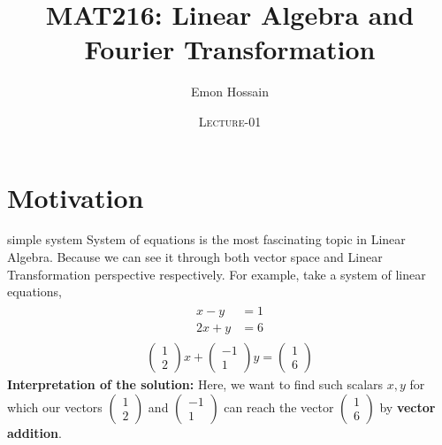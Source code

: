 \documentclass[11pt]{beamer}
\author[] %
{Emon Hossain\inst{1}}
\institute[University of Dhaka] %
{
  \inst{1}%
  Lecturer\\
  emon.hossain@bracu.ac.bd\\
  \\MNS department\\Brac University
}
\date[] %
{\textsc{Lecture-01}}
\title[]{MAT216: Linear Algebra and Fourier Transformation}
\theoremstyle{plain}
\begin{document}
\begin{frame}
\titlepage
\end{frame}

\section{Motivation}
\begin{frame}{simple system}
System of equations is the most fascinating topic in Linear Algebra. Because we can see it through both vector space and Linear Transformation perspective respectively. For example, take a system of linear equations,
\begin{align}
\begin{split}
    x-y&=1\\
    2x+y&=6
\end{split}
\end{align}
\pause
\begin{align*}
    \begin{pmatrix}
        1\\2
    \end{pmatrix}x+\begin{pmatrix}
        -1\\1
    \end{pmatrix}y=\begin{pmatrix}
        1\\6
    \end{pmatrix}
\end{align*}
\pause
\textbf{Interpretation of the solution:} Here, we want to find such scalars $x,y$ for which our vectors $\begin{pmatrix}
    1\\2
\end{pmatrix}$ and $\begin{pmatrix}
    -1\\1
\end{pmatrix}$ can reach the vector $\begin{pmatrix}
    1\\6
\end{pmatrix}$ by \textbf{vector addition}.
\end{frame}
\end{document}
